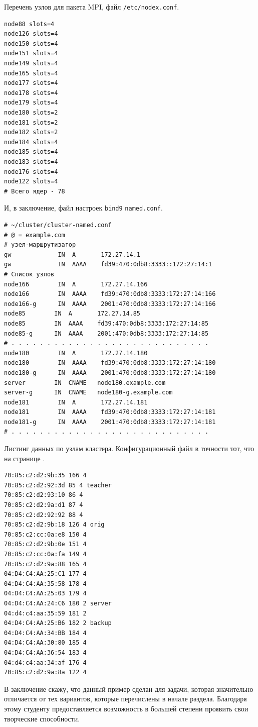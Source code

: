 \documentclass[12pt]{article}
\begin{document}
Перечень узлов для пакета MPI, файл \texttt{/etc/nodex.conf}.
\begin{verbatim}
node88 slots=4
node126 slots=4
node150 slots=4
node151 slots=4
node149 slots=4
node165 slots=4
node177 slots=4
node178 slots=4
node179 slots=4
node180 slots=2
node181 slots=2
node182 slots=2
node184 slots=4
node185 slots=4
node183 slots=4
node176 slots=4
node122 slots=4
# Всего ядер - 78
\end{verbatim}

И, в заключение, файл настроек \texttt{bind9} \texttt{named.conf}.
\begin{verbatim}
# ~/cluster/cluster-named.conf
# @ = example.com
# узел-маршрутизатор
gw             IN  A       172.27.14.1
gw             IN  AAAA    fd39:470:0db8:3333::172:27:14:1
# Список узлов
node166        IN  A       172.27.14.166
node166        IN  AAAA    fd39:470:0db8:3333:172:27:14:166
node166-g      IN  AAAA    2001:470:0db8:3333:172:27:14:166
node85        IN  A       172.27.14.85
node85        IN  AAAA    fd39:470:0db8:3333:172:27:14:85
node85-g      IN  AAAA    2001:470:0db8:3333:172:27:14:85
# . . . . . . . . . . . . . . . . . . . . . . . . . . . .
node180        IN  A       172.27.14.180
node180        IN  AAAA    fd39:470:0db8:3333:172:27:14:180
node180-g      IN  AAAA    2001:470:0db8:3333:172:27:14:180
server        IN  CNAME   node180.example.com
server-g      IN  CNAME   node180-g.example.com
node181        IN  A       172.27.14.181
node181        IN  AAAA    fd39:470:0db8:3333:172:27:14:181
node181-g      IN  AAAA    2001:470:0db8:3333:172:27:14:181
# . . . . . . . . . . . . . . . . . . . . . . . . . . . .
\end{verbatim}

Листинг данных по узлам кластера. Конфигурационный файл в точности тот, что на странице \pageref{conforig}.
\begin{verbatim}
70:85:c2:d2:9b:35 166 4
70:85:c2:d2:92:3d 85 4 teacher
70:85:c2:d2:93:10 86 4
70:85:c2:d2:9a:d1 87 4
70:85:c2:d2:92:92 88 4
70:85:c2:d2:9b:18 126 4 orig
70:85:c2:cc:0a:e8 150 4
70:85:c2:d2:9b:0e 151 4
70:85:c2:cc:0a:fa 149 4
70:85:c2:d2:9a:88 165 4
04:D4:C4:AA:25:C1 177 4
04:D4:C4:AA:35:58 178 4
04:D4:C4:AA:25:03 179 4
04:D4:C4:AA:24:C6 180 2 server
04:d4:c4:aa:35:59 181 2
04:D4:C4:AA:25:B6 182 2 backup
04:D4:C4:AA:34:BB 184 4
04:D4:C4:AA:30:80 185 4
04:D4:C4:AA:36:54 183 4
04:d4:c4:aa:34:af 176 4
70:85:c2:d2:9a:8a 122 4
\end{verbatim}

В заключение скажу, что данный пример сделан для задачи, которая значительно отличается от тех вариантов, которые перечислены в начале раздела. Благодаря этому студенту предоставляется возможность в большей степени проявить свои творческие способности.
\end{document}
